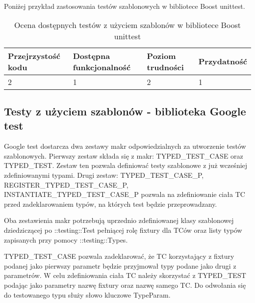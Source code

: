 \documentclass[12pt,a4paper,notitlepage]{report}
\begin{document}
Poniżej przykład zastosowania testów szablonowych w bibliotece Boost unittest.

			

\begin{center}
			\begin{table}[!ht]
			\caption{Ocena dostępnych testów z użyciem szablonów w bibliotece Boost unittest}
			\label{}
			\begin{tabular}[!hc]{|l|l|l|l|}
		\hline
		Przejrzystość kodu 	&	Dostępna funkcjonalność	&	Poziom trudności	&	Przydatność \\ \hline
		2					&	1						&	2					& 	1  			\\ \hline
			\end{tabular}
			\end{table} 
		\end{center}

\subsection{Testy z użyciem szablonów - biblioteka Google test}

Google test dostarcza dwa zestawy makr odpowiedzialnych za utworzenie testów szablonowych.
Pierwszy zestaw składa się z makr: TYPED{\_}TEST{\_}CASE oraz TYPED{\_}TEST. Zestaw ten pozwala definiować testy szablonowe z już wcześniej zdefiniowanymi typami.
Drugi zestaw: TYPED{\_}TEST{\_}CASE{\_}P, REGISTER{\_}TYPED{\_}TEST{\_}CASE{\_}P, INSTANTIATE{\_}TYPED{\_}TEST{\_}CASE{\_}P pozwala na zdefiniowanie ciała TC przed zadeklarowaniem typów, na których test będzie przeprowadzany.

Oba zestawienia makr potrzebują uprzednio zdefiniowanej klasy szablonowej dziedziczącej po ::testing::Test pełniącej rolę fixtury dla TCów oraz listy typów zapisanych przy pomocy ::testing::Types.

TYPED{\_}TEST{\_}CASE pozwala zadeklarować, że TC korzystający z fixtury podanej jako pierwszy parametr będzie przyjmował typy podane jako drugi z parametrów. W celu zdefiniowania ciała TC należy skorzystać z TYPED{\_}TEST podając jako parametry nazwę fixtury oraz nazwę samego TC.
Do odwołania się do testowanego typu służy słowo kluczowe TypeParam.
\end{document}
